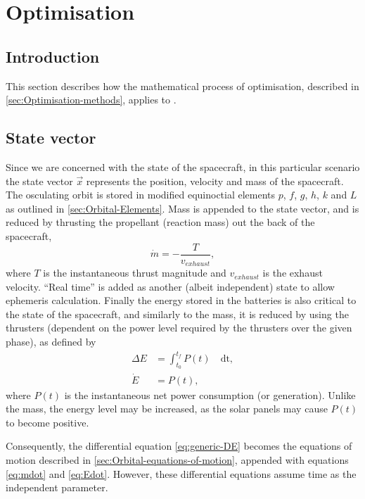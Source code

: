 \chapter{Optimisation} \label{cha:Optimisation}
\section{Introduction} \label{sec:Optimisation-Introduction}

This section describes how the mathematical process of optimisation, described in \autoref{sec:Optimisation-methods}, applies to \BW.

\section{State vector} \label{sec:state-vector}

Since we are concerned with the state of the spacecraft, in this particular scenario the state vector $\vec{x}$ represents the position, velocity and mass of the spacecraft. The osculating orbit is stored in modified equinoctial elements $p$, $f$, $g$, $h$, $k$ and $L$ as outlined in \autoref{sec:Orbital-Elements}. Mass is appended to the state vector, and is reduced by thrusting the propellant (reaction mass) out the back of the spacecraft, 
\begin{equation}
\dot{m}=-\frac{T}{v_{exhaust}} \label{eq:mdot},
\end{equation}
where $T$ is the instantaneous thrust magnitude and $v_{exhaust}$ is the exhaust velocity. \enquote{Real time} is added as another (albeit independent) state to allow ephemeris calculation. Finally the energy stored in the batteries is also critical to the state of the spacecraft, and similarly to the mass, it is reduced by using the thrusters (dependent on the power level required by the thrusters over the given phase), as defined by
\begin{subequations}\label{eq:edot}
\begin{align}
\Delta E &= \int_{t_0}^{t_f} P(t)\quad \text{dt} \label{eq:delta-E}, \\
\dot{E} &= P(t) \label{eq:Edot},
\end{align} 
\end{subequations} where $P(t)$ is the instantaneous net power consumption (or generation). Unlike the mass, the energy level may be increased, as the solar panels may cause $P(t)$ to become positive.

Consequently, the differential equation \eqref{eq:generic-DE} becomes the equations of motion described in \autoref{sec:Orbital-equations-of-motion}, appended with equations \eqref{eq:mdot} and \eqref{eq:Edot}. However, these differential equations assume time as the independent parameter.

